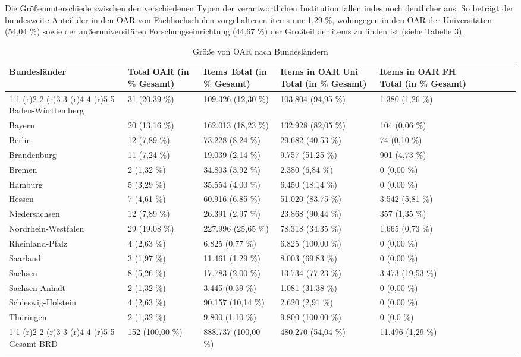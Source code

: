 \documentclass[a4paper,
fontsize=11pt,
oneside,
numbers=noperiodatend,
parskip=half-,
bibliography=totoc,
final
]{scrartcl}
\begin{document}
Die Größenunterschiede zwischen den verschiedenen Typen der
verantwortlichen Institution fallen indes noch deutlicher aus. So
beträgt der bundesweite Anteil der in den OAR von Fachhochschulen
vorgehaltenen items nur 1,29 \%, wohingegen in den OAR der Universitäten
(54,04 \%) sowie der außeruniversitären Forschungseinrichtung (44,67 \%)
der Großteil der items zu finden ist (siehe Tabelle 3).

\begin{table}[ht]
\centering
\small
\begin{tabular}{p{3cm}p{3cm}p{3cm}p{3cm}p{3cm} lrrrr}
  \toprule
Bundesländer & Total OAR (in \% Gesamt)  & Items Total (in \% Gesamt)  & Items in OAR Uni Total (in \% Gesamt)  & Items in OAR FH Total (in \% Gesamt)  \\ 
    \cmidrule(r){1-1} \cmidrule(r){2-2} \cmidrule(r){3-3} \cmidrule(r){4-4} \cmidrule(r){5-5} 
Baden-Württemberg & 31 (20,39 \%) & 109.326 (12,30 \%) & 103.804 (94,95 \%) & 1.380 (1,26 \%) \\ 
  Bayern & 20 (13,16 \%) & 162.013 (18,23 \%) & 132.928 (82,05 \%) & 104 (0,06 \%) \\ 
  Berlin & 12 (7,89 \%) & 73.228 (8,24 \%) & 29.682 (40,53 \%) & 74 (0,10 \%) \\ 
  Brandenburg & 11 (7,24 \%) & 19.039 (2,14 \%) & 9.757 (51,25 \%) & 901 (4,73 \%) \\ 
  Bremen & 2 (1,32 \%) & 34.803 (3,92 \%) & 2.380 (6,84 \%) & 0 (0,00 \%) \\ 
  Hamburg & 5 (3,29 \%) & 35.554 (4,00 \%) & 6.450 (18,14 \%) & 0 (0,00 \%) \\ 
  Hessen & 7 (4,61 \%) & 60.916 (6,85 \%) & 51.020 (83,75 \%) & 3.542 (5,81 \%) \\ 
  Niedersachsen & 12 (7,89 \%) & 26.391 (2,97 \%) & 23.868 (90,44 \%) & 357 (1,35 \%) \\ 
  Nordrhein-Westfalen & 29 (19,08 \%) & 227.996 (25,65 \%) & 78.318 (34,35 \%) & 1.665 (0,73 \%) \\ 
  Rheinland-Pfalz & 4 (2,63 \%) & 6.825 (0,77 \%) & 6.825 (100,00 \%) & 0 (0,00 \%) \\ 
  Saarland & 3 (1,97 \%) & 11.461 (1,29 \%) & 8.003 (69,83 \%) & 0 (0,00 \%) \\ 
  Sachsen & 8 (5,26 \%) & 17.783 (2,00 \%) & 13.734 (77,23 \%) & 3.473 (19,53 \%) \\ 
  Sachsen-Anhalt & 2 (1,32 \%) & 3.445 (0,39 \%) & 1.081 (31,38 \%) & 0 (0,00 \%) \\ 
  Schleswig-Holstein & 4 (2,63 \%) & 90.157 (10,14 \%) & 2.620 (2,91 \%) & 0 (0,00 \%) \\ 
  Thüringen & 2 (1,32 \%) & 9.800 (1,10 \%) & 9.800 (100,00 \%) & 0 (0,0 \%) \\   \cmidrule(r){1-1} \cmidrule(r){2-2} \cmidrule(r){3-3} \cmidrule(r){4-4} \cmidrule(r){5-5} 
  Gesamt BRD & 152 (100,00 \%) & 888.737 (100,00 \%) & 480.270 (54,04 \%) & 11.496 (1,29 \%) \\ 
   \bottomrule
\end{tabular}
\caption{Größe von OAR nach Bundesländern}
\end{table}
\end{document}

